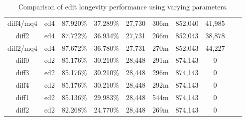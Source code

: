 \begin{sidewaystable}[!tp]
\begin{center}
\begin{tabular}{|c|c|c|c||c|c||c|c|c|c|}
diff4/mq4 & ed4 & 87.920\% & 37.289\% & 27,730 & 306m & 852,040 & 41,985 \\
diff2 & ed4 & 87.722\% & 36.934\% & 27,731 & 266m & 852,043 & 38,878 \\
diff2/mq4 & ed4 & 87.672\% & 36.780\% & 27,731 & 270m & 852,043 & 44,227 \\
diff0 & ed2 & 85.176\% & 30.210\% & 28,448 & 291m & 874,143 & 0 \\
diff3 & ed2 & 85.176\% & 30.210\% & 28,448 & 296m & 874,143 & 0 \\
diff4 & ed2 & 85.176\% & 30.210\% & 28,448 & 292m & 874,143 & 0 \\
diff1 & ed2 & 85.136\% & 29.983\% & 28,448 & 544m & 874,143 & 0 \\
diff2 & ed2 & 82.268\% & 24.770\% & 28,448 & 269m & 874,143 & 0 \\
\hline
\end{tabular}
\end{center}
\caption{Comparison of edit longevity performance using
    varying parameters.}
\label{tab:editlongeval}
\end{sidewaystable}

